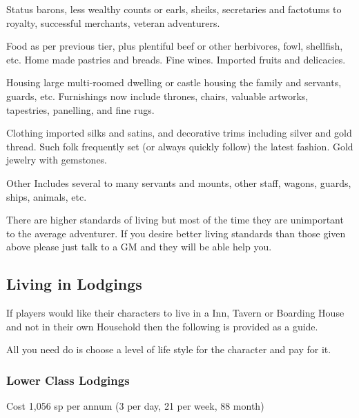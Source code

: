 \documentclass[twoside,a4paper]{article}
\begin{document}
\begin{multicols}{2}
\begin{idesc}
\item[Status] barons, less wealthy counts or earls, sheiks,
secretaries and factotums to royalty, successful merchants, veteran
adventurers.

\item[Food] as per previous tier, plus plentiful beef or other
herbivores, fowl, shellfish, etc. Home made pastries and breads. Fine
wines. Imported fruits and delicacies.

\item[Housing] large multi-roomed dwelling or castle housing the
family and servants, guards, etc.  Furnishings now include thrones,
chairs, valuable artworks, tapestries, panelling, and fine rugs.

\item[Clothing] imported silks and satins, and decorative trims
including silver and gold thread. Such folk frequently set (or always
quickly follow) the latest fashion. Gold jewelry with gemstones.

\item[Other] Includes several to many servants and mounts, other
staff, wagons, guards, ships, animals, etc.

\end{idesc}

There are higher standards of living but most of the time they are
unimportant to the average adventurer. If you desire better living
standards than those given above please just talk to a GM and they
will be able help you.

\subsection{Living in Lodgings}

If players would like their characters to live in a Inn, Tavern or
Boarding House and not in their own Household then the following is
provided as a guide.

All you need do is choose a level of life style for the character and
pay for it.


\subsubsection{Lower Class Lodgings}

\begin{idesc}

\item[Cost] 1,056 sp per annum (3 per day, 21 per week, 88 month)


\end{idesc}
\end{multicols}
\end{document}
